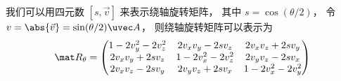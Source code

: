 

我们可以用四元数 $[s, \vec v]$ 来表示绕轴旋转矩阵， 其中 $s = \cos(\theta/2)$， 令 $v = \abs{\vec v} = \sin(\theta/2)\uvec A$， 则绕轴旋转矩阵可以表示为
\begin{equation}
\mat R_\theta =
\begin{pmatrix}
1 - 2v_y^2 - 2v_z^2 & 2v_xv_y - 2sv_z  & 2v_x v_z + 2s v_y\\
2v_x v_y + 2sv_z & 1 - 2v_x^2 - 2v_z^2 & 2v_y v_z - 2s v_x\\
2v_x v_z - 2s v_y & 2v_y v_z + 2s v_x & 1 - 2v_x^2 - 2v_y^2
\end{pmatrix}
\end{equation}